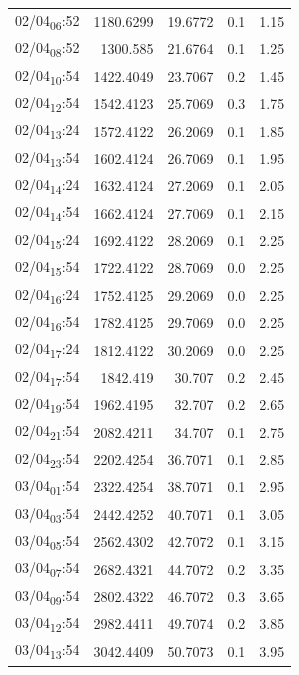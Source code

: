 \documentclass[11pt]{article}
\begin{document}
\begin{center}
\begin{tabular}{lrrrr}
02/04\textsubscript{06}:52 & 1180.6299 & 19.6772 & 0.1 & 1.15\\[0pt]
02/04\textsubscript{08}:52 & 1300.585 & 21.6764 & 0.1 & 1.25\\[0pt]
02/04\textsubscript{10}:54 & 1422.4049 & 23.7067 & 0.2 & 1.45\\[0pt]
02/04\textsubscript{12}:54 & 1542.4123 & 25.7069 & 0.3 & 1.75\\[0pt]
02/04\textsubscript{13}:24 & 1572.4122 & 26.2069 & 0.1 & 1.85\\[0pt]
02/04\textsubscript{13}:54 & 1602.4124 & 26.7069 & 0.1 & 1.95\\[0pt]
02/04\textsubscript{14}:24 & 1632.4124 & 27.2069 & 0.1 & 2.05\\[0pt]
02/04\textsubscript{14}:54 & 1662.4124 & 27.7069 & 0.1 & 2.15\\[0pt]
02/04\textsubscript{15}:24 & 1692.4122 & 28.2069 & 0.1 & 2.25\\[0pt]
02/04\textsubscript{15}:54 & 1722.4122 & 28.7069 & 0.0 & 2.25\\[0pt]
02/04\textsubscript{16}:24 & 1752.4125 & 29.2069 & 0.0 & 2.25\\[0pt]
02/04\textsubscript{16}:54 & 1782.4125 & 29.7069 & 0.0 & 2.25\\[0pt]
02/04\textsubscript{17}:24 & 1812.4122 & 30.2069 & 0.0 & 2.25\\[0pt]
02/04\textsubscript{17}:54 & 1842.419 & 30.707 & 0.2 & 2.45\\[0pt]
02/04\textsubscript{19}:54 & 1962.4195 & 32.707 & 0.2 & 2.65\\[0pt]
02/04\textsubscript{21}:54 & 2082.4211 & 34.707 & 0.1 & 2.75\\[0pt]
02/04\textsubscript{23}:54 & 2202.4254 & 36.7071 & 0.1 & 2.85\\[0pt]
03/04\textsubscript{01}:54 & 2322.4254 & 38.7071 & 0.1 & 2.95\\[0pt]
03/04\textsubscript{03}:54 & 2442.4252 & 40.7071 & 0.1 & 3.05\\[0pt]
03/04\textsubscript{05}:54 & 2562.4302 & 42.7072 & 0.1 & 3.15\\[0pt]
03/04\textsubscript{07}:54 & 2682.4321 & 44.7072 & 0.2 & 3.35\\[0pt]
03/04\textsubscript{09}:54 & 2802.4322 & 46.7072 & 0.3 & 3.65\\[0pt]
03/04\textsubscript{12}:54 & 2982.4411 & 49.7074 & 0.2 & 3.85\\[0pt]
03/04\textsubscript{13}:54 & 3042.4409 & 50.7073 & 0.1 & 3.95\\[0pt]

\end{tabular}
\end{center}
\end{document}
